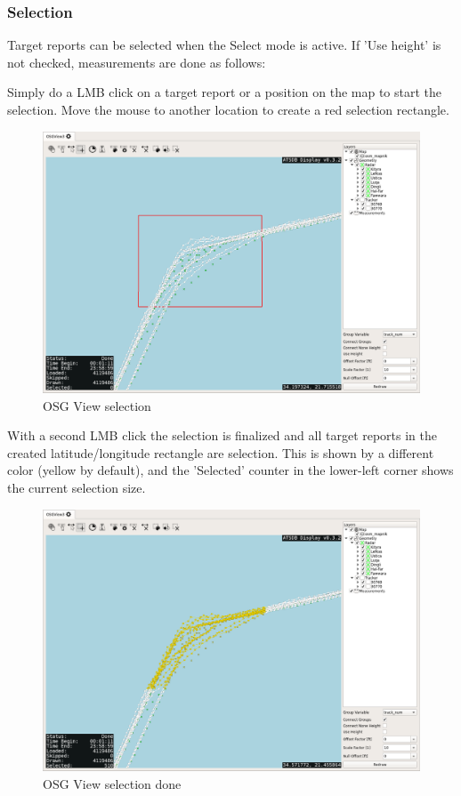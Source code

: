 {\subsubsection{Selection}

Target reports can be selected when the Select mode is active. If 'Use height' is not checked, measurements are done as follows:

Simply do a LMB click on a target report or a position on the map to start the selection. Move the mouse to another location to create a red selection rectangle.

\begin{figure}[H]
    \hspace*{-2cm}
    \includegraphics[width=18cm,frame]{../screenshots/osgview_select1.png}
  \caption{OSG View selection}
\end{figure}

With a second LMB click the selection is finalized and all target reports in the created latitude/longitude rectangle are selection. This is shown by a different color (yellow by default), and the 'Selected' counter in the lower-left corner shows the current selection size.

\begin{figure}[H]
    \hspace*{-2cm}
    \includegraphics[width=18cm,frame]{../screenshots/osgview_select2.png}
  \caption{OSG View selection done}
\end{figure}

}
